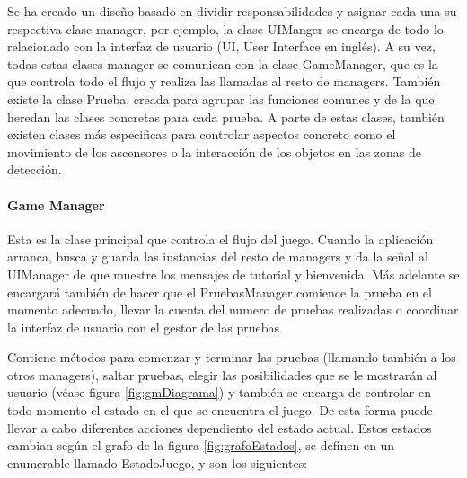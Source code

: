 Se ha creado un diseño basado en dividir responsabilidades y asignar cada una su respectiva clase manager, por ejemplo, la clase UIManger se encarga de todo lo relacionado con la interfaz de usuario (UI, User Interface en inglés). A su vez, todas estas clases manager se comunican con la clase GameManager, que es la que controla todo el flujo y realiza las llamadas al resto de managers. También existe la clase Prueba, creada para agrupar las funciones comunes y de la que heredan las clases concretas para cada prueba. A parte de estas clases, también existen clases más especificas para controlar aspectos concreto como el movimiento de los ascensores o la interacción de los objetos en las zonas de detección.

\paragraph{Game Manager}

Esta es la clase principal que controla el flujo del juego. Cuando la aplicación arranca, busca y guarda las instancias del resto de managers y da la señal al UIManager de que muestre los mensajes de tutorial y bienvenida. Más adelante se encargará también de hacer que el PruebasManager comience la prueba en el momento adecuado, llevar la cuenta del numero de pruebas realizadas o coordinar la interfaz de usuario con el gestor de las pruebas. 

Contiene métodos para comenzar y terminar las pruebas (llamando también a los otros managers), saltar pruebas, elegir las posibilidades que se le mostrarán al usuario (véase figura \ref{fig:gmDiagrama}) y también se encarga de controlar en todo momento el estado en el que se encuentra el juego. De esta forma puede llevar a cabo diferentes acciones dependiento del estado actual. Estos estados cambian según el grafo de la figura \ref{fig:grafoEstados}, se definen en un enumerable llamado EstadoJuego, y son los siguientes:

